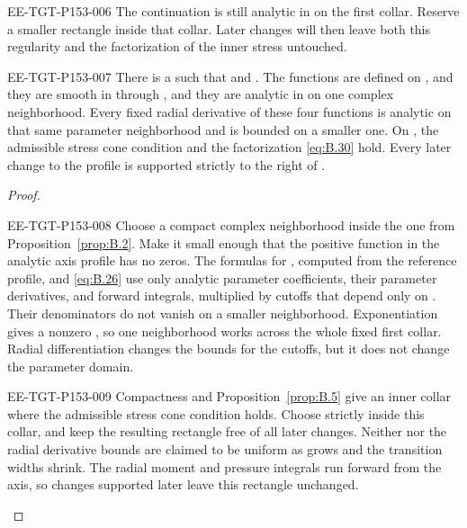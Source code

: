 \begin{EESegment}{EE-TGT-P153-006}
The continuation is still analytic in  on the first collar. Reserve a
smaller rectangle inside that collar. Later changes will then leave both this regularity and the
factorization of the inner stress untouched.
\end{EESegment}

\begin{corollary}\label{cor:B.6}
\begin{EESegment}{EE-TGT-P153-007}
There is a  such that  and
. The functions
 are defined on
, and they are smooth in
 through , and they are analytic in
 on one complex neighborhood. Every fixed radial derivative of these four
functions is analytic on that same parameter neighborhood and is bounded on a smaller one. On
, the admissible stress cone condition and the
factorization \eqref{eq:B.30} hold. Every later change to the profile is supported strictly to the
right of .
\end{EESegment}
\end{corollary}
\begin{proof}
\begin{EESegment}{EE-TGT-P153-008}
Choose a compact complex neighborhood inside the one from Proposition~\ref{prop:B.2}. Make it
small enough that the positive function  in the analytic axis profile has
no zeros. The formulas for , computed from the reference profile, and
\eqref{eq:B.26} use only analytic parameter coefficients, their parameter derivatives, and forward
integrals, multiplied by cutoffs that depend only on . Their denominators do
not vanish on a smaller neighborhood. Exponentiation gives a nonzero
, so one neighborhood works across the whole fixed first collar. Radial
differentiation changes the bounds for the cutoffs, but it does not change the parameter domain.
\end{EESegment}

\begin{EESegment}{EE-TGT-P153-009}
Compactness and Proposition~\ref{prop:B.5} give an inner collar where the admissible stress cone
condition holds. Choose  strictly inside this collar, and keep the resulting
rectangle free of all later changes. Neither  nor the radial derivative
bounds are claimed to be uniform as  grows and the transition widths
shrink. The radial moment and pressure integrals run forward from the axis, so changes supported
later leave this rectangle unchanged.
\end{EESegment}
\end{proof}

